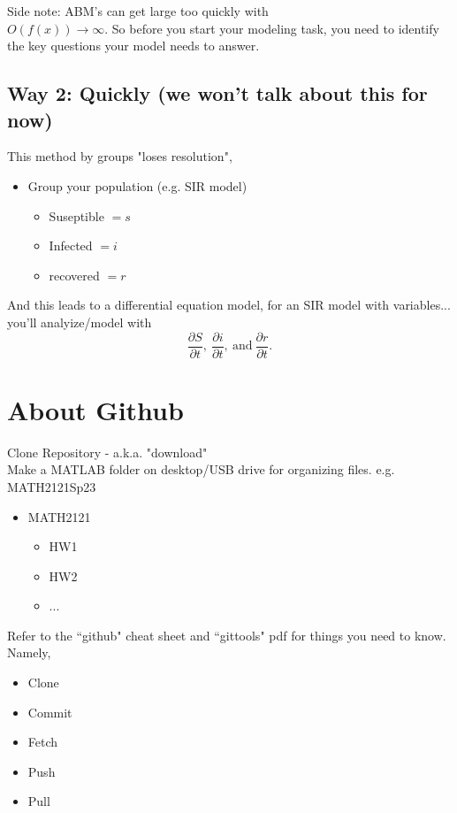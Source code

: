 \documentclass[12pt]{book}
\begin{document}
\noindent Side note: ABM's can get large too quickly with \\
$O(f(x)) \rightarrow \infty$. So before you start your modeling task, you need to identify the key questions your model needs to answer.



\subsection{Way 2: Quickly (we won't talk about this for now)}
\noindent This method by groups "loses resolution",
\begin{itemize}
\item Group your population (e.g. SIR model)
	\begin{itemize}
	\item Suseptible $=s$
	\item Infected $=i$
	\item recovered $=r$
	\end{itemize}
\end{itemize}

And this leads to a differential equation model, for an SIR model with variables...
you'll analyize/model with 
$$\frac{\partial S}{\partial t},~\frac{\partial i}{\partial t},~\text{and}~\frac{\partial r}{\partial t}.$$



\section{About Github}

Clone Repository - a.k.a. "download"\\
Make a MATLAB folder on desktop/USB drive for organizing files. 
e.g. MATH2121Sp23
\begin{itemize}
\item MATH2121
	\begin{itemize}
	\item HW1
	\item HW2
	\item ...
	\end{itemize}
\end{itemize}

Refer to the ``github" cheat sheet and ``gittools" pdf for things you need to know. Namely,
\begin{itemize}
\item Clone
\item Commit
\item Fetch
\item Push
\item Pull
\end{itemize}
\end{document}
